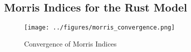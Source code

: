 



\subsection{Morris Indices for the Rust Model}

\begin{figure}[t]
	\caption{Convergence of Morris Indices}
    \label{morris_convergence}
	\vspace*{-4mm}
	\centering
	\texttt{[image: ../figures/morris\_convergence.png]}
\end{figure}


%         

